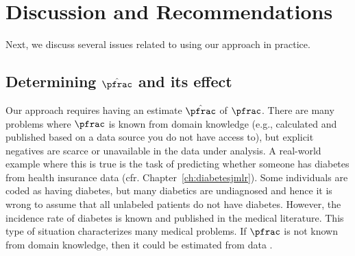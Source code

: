 \newcommand{\covtype}{\texttt{covtype}\xspace}
\newcommand{\sensit}{\texttt{sensit}\xspace}

\newcommand{\resultcurves}[2]{
\begin{figure}[!h]
\centering
\subfigure[\covtype.]{\texttt{[image: \#1\_covtype\_pu\_resvm.pdf]}}\qquad
\subfigure[\sensit.]{\texttt{[image: \#1\_sensit\_2\_semi\_resvm.pdf]}}\\
\caption{#2}
\label{fig:results-#1}
\end{figure}
}

\newcommand{\resultcurvesnew}[2]{
\begin{figure}[!h]
\centering
\subfigure[Rank CDF for \covtype.]{\texttt{[image: \#1\_cdf.pdf]}}\qquad
\subfigure[ROC curves for \covtype.]{\texttt{[image: \#1\_roc.pdf]}}\qquad
\subfigure[PR curves for \covtype.]{\texttt{[image: \#1\_pr.pdf]}}
\caption{#2}
\label{fig:results-#1}
\end{figure}
}

\section{Discussion and Recommendations}
Next, we discuss several issues related to using our approach in practice. 

\subsection{Determining $\hat{\pfrac}$ and its effect}

Our approach requires having an estimate $\hat{\pfrac}$ of $\pfrac$. There are many problems where $\pfrac$ is known from domain knowledge (e.g., calculated and published based on a data source you do not have access to), but explicit negatives are scarce or unavailable in the data under analysis. A real-world example where this is true is the task of predicting whether someone has diabetes from health insurance data (cfr. Chapter~\ref{ch:diabetesjmlr}). Some individuals are coded as having diabetes, but many diabetics are undiagnosed and hence it is wrong to assume that all unlabeled patients do not have diabetes. However, the incidence rate of diabetes is known and published in the medical literature. This type of situation characterizes many medical problems. If $\pfrac$ is not known from domain knowledge, then it could be estimated from data \citep{Elkan:2008:LCO:1401890.1401920, scottblanchard,scholkopf2001estimating}.

